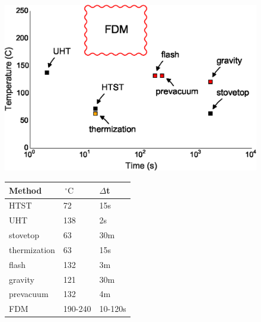 \documentclass[fleqn,10pt]{wlpeerj}
\begin{document}
\begin{figure}
  \begin{minipage}[c]{0.60\linewidth}
    \centering
    \includegraphics[width=\textwidth]{Fig1}
    \par\vspace{0pt}
  \end{minipage}%
  \begin{minipage}[c]{0.40\linewidth}
    \centering%
    
    \begin{tabular}{@{}lll@{}}
    \toprule
    Method       & $\,^{\circ}\mathrm{C}$ & $\Delta$t \\ \midrule
    HTST         & 72      & 15s    \\
    UHT          & 138     & 2s     \\
    stovetop     & 63      & 30m    \\
    thermization & 63      & 15s    \\
    flash        & 132     & 3m     \\
    gravity      & 121     & 30m    \\
    prevacuum    & 132     & 4m     \\
    FDM          & 190-240 & 10-120s\\ \bottomrule
    \end{tabular}

    \par\vspace{0pt}
    \end{minipage}


\end{figure}
\end{document}
